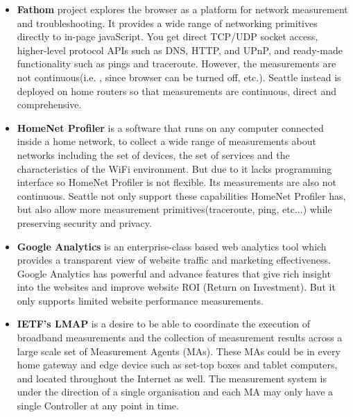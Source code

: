 \begin{itemize}
\item \textbf{Fathom} project explores the browser as a platform for network measurement and troubleshooting. It provides a wide range of networking primitives directly to in-page javaScript. You get direct TCP/UDP socket access, higher-level protocol APIs such as DNS, HTTP, and UPnP, and ready-made functionality such as pings and traceroute. However, the measurements are not continuous(i.e. , since browser can be turned off, etc.). Seattle instead is deployed on home routers so that measurements are continuous, direct and comprehensive.
\item \textbf{HomeNet Profiler} is a software that runs on any computer connected inside a home network, to collect a wide range of measurements about networks including the set of devices, the set of services and the characteristics of the WiFi environment. But due to it lacks programming interface so HomeNet Profiler is not flexible. Its measurements are also not continuous. Seattle not only support these capabilities HomeNet Profiler has, but also allow more measurement primitives(traceroute, ping, etc...) while preserving security and privacy.
\item \textbf{Google Analytics} is an enterprise-class based web analytics tool which provides a transparent view of website traffic and marketing effectiveness. Google Analytics has powerful and advance features that give rich insight into the websites and improve website ROI (Return on Investment). But it only supports limited website performance measurements.
\item \textbf{IETF's LMAP} is a desire to be able to coordinate the execution of broadband measurements and the collection of measurement results across a large scale set of Measurement Agents (MAs). These MAs could be in every home gateway and edge device such as set-top boxes and tablet computers, and located throughout the Internet as well. The measurement system is under the direction of a single organisation and each MA may only have a single Controller at any point in time.
\end{itemize}
